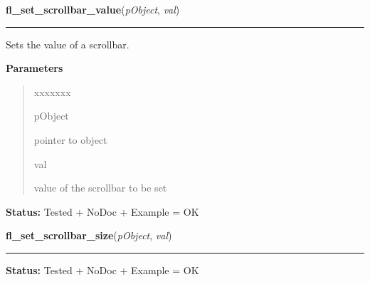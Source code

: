 \hspace{.8\funcindent}\begin{boxedminipage}{\funcwidth}

    \raggedright \textbf{fl\_set\_scrollbar\_value}(\textit{pObject}, \textit{val})

    \vspace{-1.5ex}

    \rule{\textwidth}{0.5\fboxrule}
\setlength{\parskip}{2ex}
    Sets the value of a scrollbar.

\setlength{\parskip}{1ex}
      \textbf{Parameters}
      \vspace{-1ex}

      \begin{quote}
        \begin{Ventry}{xxxxxxx}

          \item[pObject]

          pointer to object

          \item[val]

          value of the scrollbar to be set

        \end{Ventry}

      \end{quote}

\textbf{Status:} Tested + NoDoc + Example = OK



    \end{boxedminipage}

    \label{xformslib:library:fl_set_scrollbar_size}

    \vspace{0.5ex}

\hspace{.8\funcindent}\begin{boxedminipage}{\funcwidth}

    \raggedright \textbf{fl\_set\_scrollbar\_size}(\textit{pObject}, \textit{val})

    \vspace{-1.5ex}

    \rule{\textwidth}{0.5\fboxrule}
\setlength{\parskip}{2ex}
\setlength{\parskip}{1ex}
\textbf{Status:} Tested + NoDoc + Example = OK



    \end{boxedminipage}

